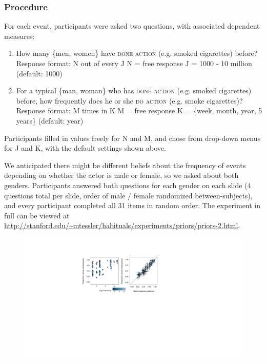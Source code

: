 \documentclass[10pt,letterpaper]{article}
\newcommand{\ndg}[1]{\textcolor{Green}{[ndg: #1]}}
\begin{document}
\subsubsection{Procedure}

For each event, participants were asked two questions, with associated dependent measures:
\begin{enumerate}
\item How many \{men, women\} have \textsc{done action} (e.g. smoked cigarettes) before?
\subitem Response format: N out of every J
\subitem N = free response
\subitem J = 1000 - 10 million (default: 1000)
\item For a typical \{man, woman\} who has \textsc{done action}  (e.g. smoked cigarettes) before, how frequently does he or she \textsc{do action} (e.g. smoke cigarettes)?
\subitem Response format: M times in K
\subitem M = free response
\subitem K = \{week, month, year, 5 years\} (default: year)
\end{enumerate}
Participants filled in values freely for N and M, and chose from drop-down menus for J and K, with the default settings shown above. 

We anticipated there might be different beliefs about the frequency of events depending on whether the actor is male or female, so we asked about both genders. Participants answered both questions for each gender on each slide (4 questions total per slide, order of male / female randomized between-subjects), and every participant completed all 31 items in random order.
The experiment in full can be viewed at \url{http://stanford.edu/~mtessler/habituals/experiments/priors/priors-2.html}.

\begin{figure}[t]
\centering
  \includegraphics[width=\textwidth]{tj-scatters}
  \caption{}
  \label{fig:tjScatters}
\end{figure}
\end{document}
